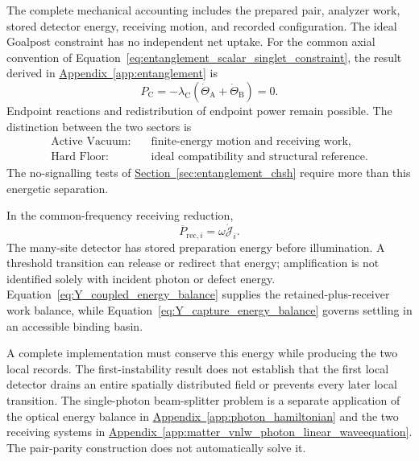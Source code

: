 The complete mechanical accounting includes the prepared pair, analyzer work, stored detector energy, receiving motion, and recorded configuration. The ideal Goalpost constraint has no independent net uptake. For the common axial convention of Equation~\eqref{eq:entanglement_scalar_singlet_constraint}, the result derived in \hyperref[app:entanglement]{Appendix~\ref*{app:entanglement}} is
\begin{equation}
    \boxed{
    P_{\mathrm C}
    =-\lambda_{\mathrm C}
       (\dot\Theta_{\mathrm A}+\dot\Theta_{\mathrm B})=0
    }.
    \label{eq:entanglement_constraint_zero_net_work}
\end{equation}
Endpoint reactions and redistribution of endpoint power remain possible. The distinction between the two sectors is
\begin{equation}
    \begin{aligned}
    \text{Active Vacuum:}&\quad\text{finite-energy motion and receiving work},\\
    \text{Hard Floor:}&\quad\text{ideal compatibility and structural reference}.
    \end{aligned}
    \label{eq:entanglement_two_causal_sectors}
\end{equation}
The no-signalling tests of \hyperref[sec:entanglement_chsh]{Section~\ref*{sec:entanglement_chsh}} require more than this energetic separation.

In the common-frequency receiving reduction,
\begin{equation}
    \overline P_{\mathrm{rec},i}=\omega\dot{\mathcal J}_i.
\end{equation}
The many-site detector has stored preparation energy before illumination. A threshold transition can release or redirect that energy; amplification is not identified solely with incident photon or defect energy. Equation~\eqref{eq:Y_coupled_energy_balance} supplies the retained-plus-receiver work balance, while Equation~\eqref{eq:Y_capture_energy_balance} governs settling in an accessible binding basin.

A complete implementation must conserve this energy while producing the two local records. The first-instability result does not establish that the first local detector drains an entire spatially distributed field or prevents every later local transition. The single-photon beam-splitter problem is a separate application of the optical energy balance in \hyperref[app:photon_hamiltonian]{Appendix~\ref*{app:photon_hamiltonian}} and the two receiving systems in \hyperref[app:matter_vnlw_photon_linear_waveequation]{Appendix~\ref*{app:matter_vnlw_photon_linear_waveequation}}. The pair-parity construction does not automatically solve it.

